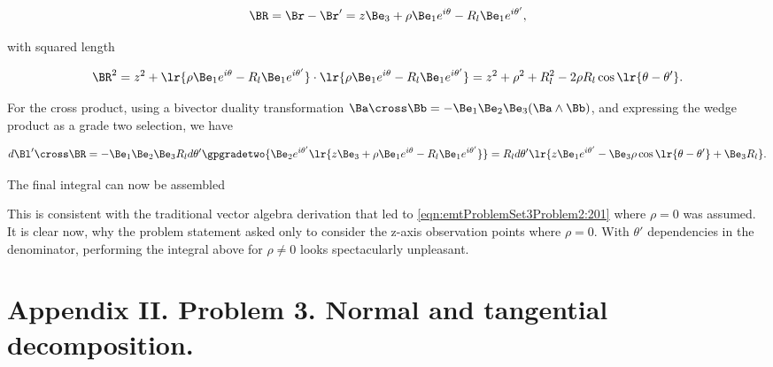 \begin{dmath}\label{eqn:emtProblemSet3Problem2:120}
\BR 
= \Br - \Br'
=
z \Be_3 + \rho \Be_1 e^{i\theta}
-
R_l \Be_1 e^{i \theta'},
\end{dmath}

with squared length

\begin{dmath}\label{eqn:emtProblemSet3Problem2:140}
\BR^2 
=
z^2 + 
\lr{ \rho \Be_1 e^{i\theta}
-
R_l \Be_1 e^{i \theta'}
}
\cdot
\lr{ \rho \Be_1 e^{i\theta}
-
R_l \Be_1 e^{i \theta'}
}
=
z^2 + \rho^2 + R_l^2 - 2 \rho R_l \cos\lr{ \theta - \theta' }.
\end{dmath}

For the cross product, using a bivector duality transformation \( \Ba \cross \Bb = -\Be_1 \Be_2 \Be_3 (\Ba \wedge \Bb) \), and expressing the wedge product as a grade two selection, we have

\begin{dmath}\label{eqn:emtProblemSet3Problem2:180}
d\Bl' \cross \BR 
=
-\Be_1 \Be_2 \Be_3 R_l d\theta' \gpgradetwo{ 
\Be_2 e^{i \theta'} 
\lr{
z \Be_3 + \rho \Be_1 e^{i\theta}
-
R_l \Be_1 e^{i \theta'}
}
}
=
R_l d\theta' \lr{ 
z \Be_1 e^{i\theta'}
-
\Be_3 \rho \cos\lr{ \theta - \theta' }
+ \Be_3 R_l
}.
\end{dmath}

The final integral can now be assembled


This is consistent with the traditional vector algebra derivation that led to \cref{eqn:emtProblemSet3Problem2:201} where \( \rho = 0 \) was assumed.
It is clear now, why the problem statement asked only to consider the z-axis observation points where \( \rho = 0 \).  With \( \theta' \) dependencies in the denominator, performing the integral above for \( \rho \ne 0 \) looks spectacularly unpleasant.

\section{Appendix II.  Problem 3.  Normal and tangential decomposition.}

